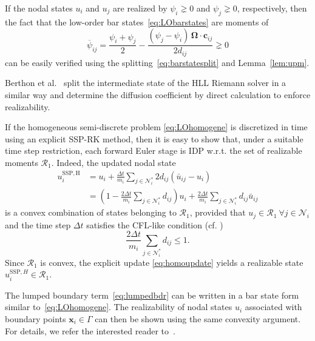 \documentclass[preprint, 11pt]{elsarticle}
\newcommand{\N}{\mathcal{N}}
\newcommand{\x}{\mathbf{x}}
\newcommand{\con}{\mathbf{c}}
\newcommand{\OO}{\bm{\Omega}}
\begin{document}
\begin{remark}
    If the nodal states $u_i$ and $u_j$ are realized by $\psi_i\gneq0$ and $\psi_j\gneq0$, respectively, then the fact that the low-order bar states~\eqref{eq:LObarstates} are moments of
    \begin{equation*}
            \overline{\psi}_{ij} = \frac{\psi_i +\psi_j}{2} -\frac{(\psi_j -\psi_i)\,\OO\cdot\con_{ij}}{2d_{ij}} \gneq 0
        \end{equation*}
can be easily verified using the splitting~\eqref{eq:barstatesplit} and Lemma~\ref{lem:upm}.
\end{remark}

\begin{remark}
Berthon et al.~\cite{berthon2007} split the intermediate state of the HLL Riemann solver in a similar way and determine the diffusion coefficient by direct calculation to enforce realizability.
\end{remark}

If the homogeneous semi-discrete problem \eqref{eq:LOhomogene} is discretized in time
using an explicit SSP-RK method, then it is easy to show that,
 under
a suitable time step restriction,
each forward
Euler stage is IDP w.r.t. the set of realizable moments $\mathcal{R}_1$. Indeed, the updated nodal state
\begin{equation}\label{eq:homoupdate}
\begin{split}
    u_i^{\mathrm{SSP,H}} &= u_i +\frac{\Delta t}{m_i}  \sum_{j \in\N_i^*} 2d_{ij} (\bar u_{ij} -u_i) \\
    &= \left(1- \frac{2\Delta t}{m_i}\sum_{j\in\N^*_i}d_{ij}\right)u_i + \frac{2\Delta t}{m_i}\sum_{j\in\N^*_i}d_{ij}\bar u_{ij}
\end{split}
\end{equation}
is a convex combination of states belonging to $\mathcal{R}_1$, provided
that  $u_j\in\mathcal{R}_1\ \forall j\in\N_i$ and the time step $\Delta t$
satisfies the CFL-like condition (cf. \cite{guermond2016})
\begin{equation}\label{eq:CFL}
	\frac{2\Delta t}{m_i}\sum_{j\in\N^*_i}d_{ij} \leq 1.
\end{equation}
Since $\mathcal{R}_1$ is convex, the explicit update \eqref{eq:homoupdate}
yields a realizable state $u_i^{\mathrm{SSP},H}\in \mathcal{R}_1$.

\begin{remark}
  The lumped boundary term~\eqref{eq:lumpedbdr} can be written in a bar state form similar to~\eqref{eq:LOhomogene}. The realizability of nodal states $u_i$ associated with
  boundary points $\x_i\in\Gamma$
  can then be shown using the same convexity argument. For details, we refer the interested reader to~\cite{hajduk2022diss, kuzmin2023, moujaes2025}.
\end{remark}
\end{document}
